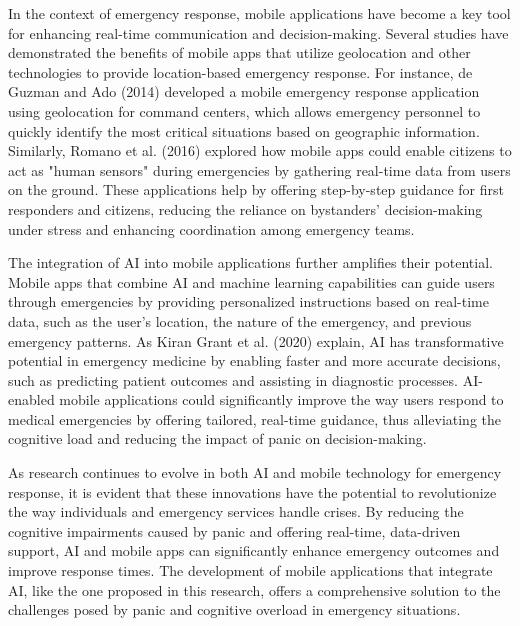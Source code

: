 In the context of emergency response, mobile applications have become a key tool for enhancing real-time communication and decision-making. Several studies have demonstrated the benefits of mobile apps that utilize geolocation and other technologies to provide location-based emergency response. For instance, de Guzman and Ado (2014) developed a mobile emergency response application using geolocation for command centers, which allows emergency personnel to quickly identify the most critical situations based on geographic information. Similarly, Romano et al. (2016) explored how mobile apps could enable citizens to act as "human sensors" during emergencies by gathering real-time data from users on the ground. These applications help by offering step-by-step guidance for first responders and citizens, reducing the reliance on bystanders' decision-making under stress and enhancing coordination among emergency teams.

The integration of AI into mobile applications further amplifies their potential. Mobile apps that combine AI and machine learning capabilities can guide users through emergencies by providing personalized instructions based on real-time data, such as the user's location, the nature of the emergency, and previous emergency patterns. As Kiran Grant et al. (2020) explain, AI has transformative potential in emergency medicine by enabling faster and more accurate decisions, such as predicting patient outcomes and assisting in diagnostic processes. AI-enabled mobile applications could significantly improve the way users respond to medical emergencies by offering tailored, real-time guidance, thus alleviating the cognitive load and reducing the impact of panic on decision-making.

As research continues to evolve in both AI and mobile technology for emergency response, it is evident that these innovations have the potential to revolutionize the way individuals and emergency services handle crises. By reducing the cognitive impairments caused by panic and offering real-time, data-driven support, AI and mobile apps can significantly enhance emergency outcomes and improve response times. The development of mobile applications that integrate AI, like the one proposed in this research, offers a comprehensive solution to the challenges posed by panic and cognitive overload in emergency situations.

% 
